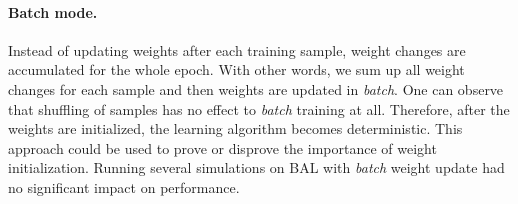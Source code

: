 \paragraph{Batch mode.} 
\label{sec:our-batch-mode}
Instead of updating weights after each training sample, weight changes are accumulated for the whole epoch. With other words, we sum up all weight changes for each sample and then weights are updated in \emph{batch}. One can observe that shuffling of samples has no effect to \emph{batch} training at all. Therefore, after the weights are initialized, the learning algorithm becomes deterministic. This approach could be used to prove or disprove the importance of weight initialization. Running several simulations on BAL with \emph{batch} weight update had no significant impact on performance. 





